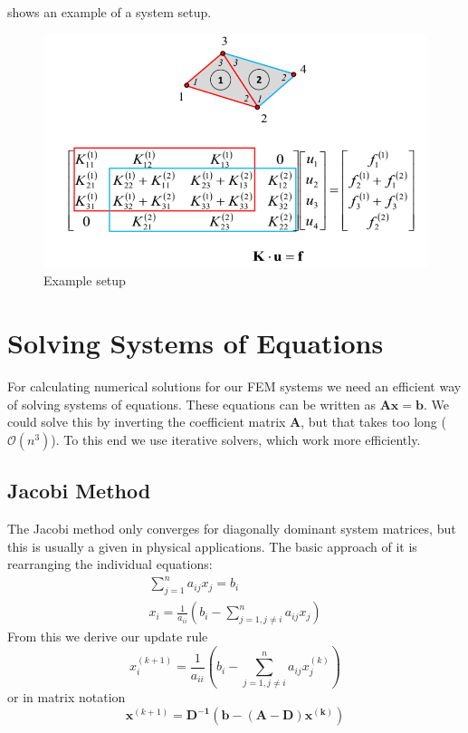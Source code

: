 \documentclass{article}
\begin{document}
 shows an example of a system setup.

\begin{figure}[h]
    \centering
    \includegraphics[width=\textwidth]{stiffness.png}
    \caption{Example setup}
    \label{fig:stiffness}
\end{figure}

\section{Solving Systems of Equations}
For calculating numerical solutions for our FEM systems we need an efficient way of solving systems of equations.
These equations can be written as $\bm{Ax} = \bm{b}$.
We could solve this by inverting the coefficient matrix $\bm{A}$, but that takes too long ($\mathcal{O}(n^3)$).
To this end we use iterative solvers, which work more efficiently.

\subsection{Jacobi Method}
The Jacobi method only converges for diagonally dominant system matrices, but this is usually a given in physical applications.
The basic approach of it is rearranging the individual equations:
\begin{gather}
    \sum_{j=1}^n a_{ij} x_j = b_i\\
    x_i = \frac{1}{a_{ii}}(b_i - \sum_{j=1, j \neq i}^{n} a_{ij} x_j)
\end{gather}
From this we derive our update rule
\begin{equation}
    x_i^{(k+1)} = \frac{1}{a_{ii}} (b_i - \sum_{j=1, j \neq i}^n a_{ij} x_j^{(k)})
\end{equation}
or in matrix notation
\begin{equation}
    \bm{x}^{(k+1)} = \bm{D^{-1} (b - (A-D)x^{(k)})}
\end{equation}
\end{document}
